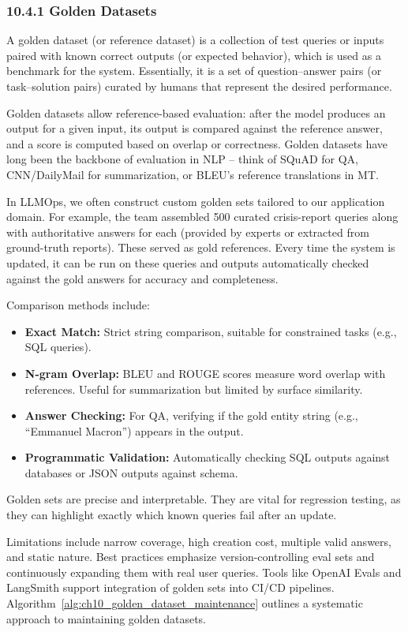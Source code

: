 \subsubsection*{10.4.1 Golden Datasets}
A golden dataset (or reference dataset) is a collection of test queries or inputs paired with known correct outputs (or expected behavior), which is used as a benchmark for the system. Essentially, it is a set of question–answer pairs (or task–solution pairs) curated by humans that represent the desired performance.  

Golden datasets allow reference-based evaluation: after the model produces an output for a given input, its output is compared against the reference answer, and a score is computed based on overlap or correctness. Golden datasets have long been the backbone of evaluation in NLP – think of SQuAD for QA, CNN/DailyMail for summarization, or BLEU’s reference translations in MT.  

In LLMOps, we often construct custom golden sets tailored to our application domain. For example, the \ishtar{} team assembled 500 curated crisis-report queries along with authoritative answers for each (provided by experts or extracted from ground-truth reports). These served as gold references. Every time the system is updated, it can be run on these queries and outputs automatically checked against the gold answers for accuracy and completeness.  

Comparison methods include:  
\begin{itemize}
    \item \textbf{Exact Match:} Strict string comparison, suitable for constrained tasks (e.g., SQL queries).  
    \item \textbf{N-gram Overlap:} BLEU and ROUGE scores measure word overlap with references. Useful for summarization but limited by surface similarity.  
    \item \textbf{Answer Checking:} For QA, verifying if the gold entity string (e.g., “Emmanuel Macron”) appears in the output.  
    \item \textbf{Programmatic Validation:} Automatically checking SQL outputs against databases or JSON outputs against schema.  
\end{itemize}  

Golden sets are precise and interpretable. They are vital for regression testing, as they can highlight exactly which known queries fail after an update.  

Limitations include narrow coverage, high creation cost, multiple valid answers, and static nature. Best practices emphasize version-controlling eval sets and continuously expanding them with real user queries. Tools like OpenAI Evals and LangSmith support integration of golden sets into CI/CD pipelines.
Algorithm~\ref{alg:ch10_golden_dataset_maintenance} outlines a systematic approach to maintaining golden datasets.

